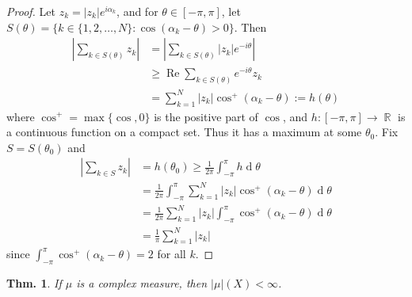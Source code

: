 \documentclass[12pt, a4paper]{book}
\DeclareMathOperator{\R}{\mathbb{R}}
\DeclareMathOperator{\re}{Re}
\renewcommand{\d}[1]{\ensuremath{\operatorname{d}\!{#1}}} %
\newtheorem{theorem}{Thm.}[section]
\theoremstyle{nonumberplain}
\newtheorem{proof}{Proof}
\begin{document}
\begin{proof}
    Let $z_k=|z_k|e^{i\alpha_k}$, and for $\theta\in[-\pi,\pi]$, let $S(\theta)=\{k\in\{1,2,\ldots,N\}:\cos(\alpha_k-\theta)>0\}$.
    Then
    \begin{align*}
        \left\lvert\sum\limits_{k\in S(\theta)}z_k\right\rvert&=\left\lvert\sum\limits_{k\in S(\theta)}|z_k|e^{-i\theta}\right\rvert\\
                                                              &\geq \re\sum\limits_{k\in S(\theta)}e^{-i\theta}z_k\\
                                                              &= \sum\limits_{k=1}^N|z_k|\cos^+(\alpha_k-\theta):=h(\theta)
    \end{align*}
    where $\cos^+=\max\{\cos,0\}$ is the positive part of $\cos$, and $h:[-\pi,\pi]\to\R$ is a continuous function on a compact set.
    Thus it has a maximum at some $\theta_0$.
    Fix $S=S(\theta_0)$ and
    \begin{align*}
        \left\lvert\sum\limits_{k\in S}z_k\right\rvert &= h(\theta_0)\geq \frac{1}{2\pi}\int_{-\pi}^\pi h\d{\theta}\\
                                                       &=\frac{1}{2\pi}\int_{-\pi}^\pi \sum\limits_{k=1}^N|z_k|\cos^+(\alpha_k-\theta)\d{\theta}\\
                                                       &= \frac{1}{2\pi}\sum\limits_{k=1}^N|z_k|\int_{-\pi}^\pi\cos^+(\alpha_k-\theta)\d{\theta}\\
                                                       &=\frac{1}{\pi}\sum\limits_{k=1}^N|z_k|
    \end{align*}
    since $\int_{-\pi}^\pi\cos^+(\alpha_k-\theta)=2$ for all $k$.
\end{proof}
\begin{theorem}
    If $\mu$ is a complex measure, then $|\mu|(X)<\infty$.
\end{theorem}
\end{document}
